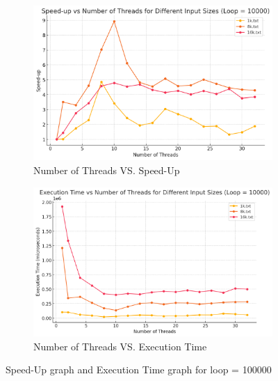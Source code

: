 \documentclass[letterpaper,12pt]{article}
\theoremstyle{remark}
\begin{document}
\begin{figure}[H]
    \centering
    \begin{subfigure}[t]{0.48\textwidth}  %
        \centering
        \includegraphics[width=\textwidth]{loop100000Yield.png}
        \caption{Number of Threads VS. Speed-Up}
        \label{fig:ThreadVsSpeedUp1}
    \end{subfigure}
    \hfill  %
    \begin{subfigure}[t]{0.48\textwidth}  %
        \centering
        \includegraphics[width=\textwidth]{loop100000YieldExecutionTime.png}
        \caption{Number of Threads VS. Execution Time}
        \label{fig:ThreadVsExecutionTime}
    \end{subfigure}
    \caption{Speed-Up graph and Execution Time graph for loop = 100000}
    \label{fig:ThreadVsComparison}
\end{figure}
\end{document}
